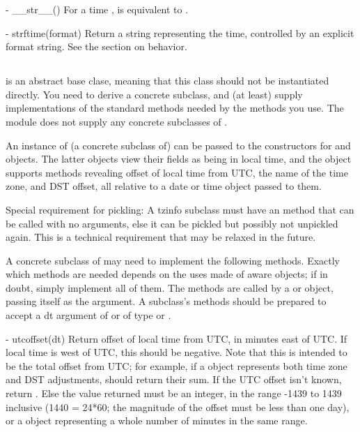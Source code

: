   - __str__()
    For a time ,  is equivalent to
    .

  - strftime(format)
    Return a string representing the time, controlled by an explicit
    format string.  See the section on  behavior.


\subsection{ \label{datetime-tzinfo}}

 is an abstract base clase, meaning that this class
should not be instantiated directly.  You need to derive a concrete
subclass, and (at least) supply implementations of the standard
 methods needed by the  methods you
use. The  module does not supply any concrete
subclasses of .

An instance of (a concrete subclass of)  can be passed
to the constructors for  and  objects.
The latter objects view their fields as being in local time, and the
 object supports methods revealing offset of local time
from UTC, the name of the time zone, and DST offset, all relative to a
date or time object passed to them.

Special requirement for pickling:  A tzinfo subclass must have an
 method that can be called with no arguments, else it
can be pickled but possibly not unpickled again.  This is a technical
requirement that may be relaxed in the future.

A concrete subclass of  may need to implement the
following methods.  Exactly which methods are needed depends on the
uses made of aware  objects; if in doubt, simply
implement all of them.  The methods are called by a 
or  object, passing itself as the argument.  A
 subclass's methods should be prepared to accept a dt
argument of  or of type  or
.

  - utcoffset(dt)
    Return offset of local time from UTC, in minutes east of UTC.  If
    local time is west of UTC, this should be negative.  Note that this
    is intended to be the total offset from UTC; for example, if a
     object represents both time zone and DST adjustments,
     should return their sum.  If the UTC offset
    isn't known, return .  Else the value returned must be
    an integer, in the range -1439 to 1439 inclusive (1440 = 24*60;
    the magnitude of the offset must be less than one day), or a
     object representing a whole number of minutes
    in the same range.

